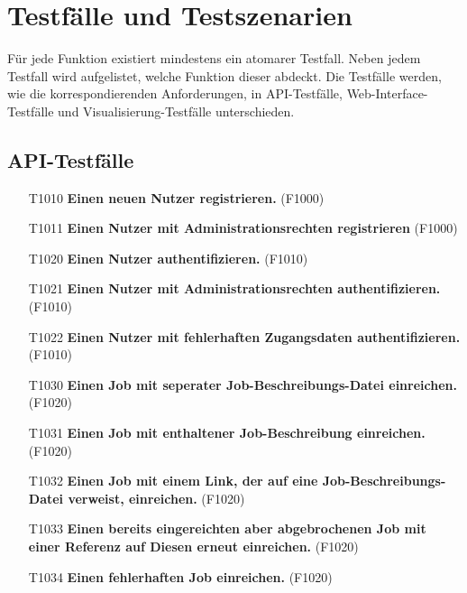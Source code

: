 \section{Testfälle und Testszenarien}
Für jede Funktion existiert mindestens ein atomarer Testfall. Neben jedem Testfall wird aufgelistet, welche Funktion dieser abdeckt. Die Testfälle werden, wie die korrespondierenden Anforderungen, in API-Testfälle, Web-Interface-Testfälle und Visualisierung-Testfälle unterschieden.

\subsection{API-Testfälle}


\begin{itemize}

    \item[T1010] \textbf{Einen neuen Nutzer registrieren.} (F1000)
    
    \item[T1011] \textbf{Einen Nutzer mit Administrationsrechten registrieren} (F1000)
    
    \item[T1020] \textbf{Einen Nutzer authentifizieren.} (F1010)
    
    \item[T1021] \textbf{Einen Nutzer mit Administrationsrechten authentifizieren.} (F1010)
    
    \item[T1022] \textbf{Einen Nutzer mit fehlerhaften Zugangsdaten authentifizieren.} (F1010)
    
    \item[T1030] \textbf{Einen Job mit seperater Job-Beschreibungs-Datei einreichen.} (F1020)
    
    \item[T1031] \textbf{Einen Job mit enthaltener Job-Beschreibung einreichen.} (F1020)
    
    \item[T1032] \textbf{Einen Job mit einem Link, der auf eine Job-Beschreibungs-Datei verweist, einreichen.} (F1020)
    
    \item[T1033] \textbf{Einen bereits eingereichten aber abgebrochenen Job mit einer Referenz auf Diesen erneut einreichen.} (F1020)
    
    \item[T1034] \textbf{Einen fehlerhaften Job einreichen.} (F1020)
    

\end{itemize}
